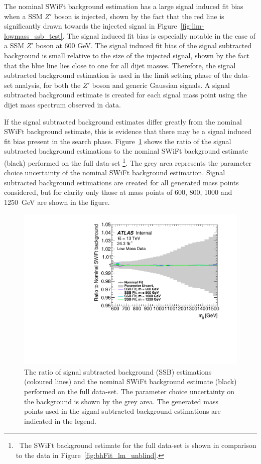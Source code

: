 The nominal SWiFt background estimation has a large signal induced fit bias when a SSM $Z'$ boson is injected,
shown by the fact that the red line is significantly drawn towards the injected signal in Figure~\ref{fig:lim-lowmass_ssb_test}.
The signal induced fit bias is especially notable in the case of a SSM $Z'$ boson at 600 GeV.
The signal induced fit bias of the signal subtracted background is small relative to the size of the injected signal,
shown by the fact that the blue line lies close to one for all dijet masses.
Therefore, the signal subtracted background estimation is used in the limit setting phase of the \lm{} data-set analysis,
for both the $Z'$ boson and generic Gaussian signals.
A signal subtracted background estimate is created for each signal mass point using the dijet mass spectrum observed in data.

If the signal subtracted background estimates differ greatly from the nominal SWiFt background estimate,
this is evidence that there may be a signal induced fit bias present in the search phase.
Figure~\ref{fig:lim-lowmass_ssb_data} shows the ratio of the 
signal subtracted background estimations to the nominal SWiFt background estimate (black) performed on the full \lm{} data-set
\footnote{\ The SWiFt background estimate for the full data-set is shown in comparison to the data in Figure~\ref{fig:bhFit_lm_unblind}.}.
The grey area represents the parameter choice uncertainty of the nominal SWiFt background estimation.
Signal subtracted background estimations are created for all generated mass points considered,
but for clarity only those at mass points of 600, 800, 1000 and 1250~GeV are shown in the figure.

\begin{figure}[!htb]
  \begin{center}
    \includegraphics[width=0.6\linewidth, angle=0]{figs/Dibjet/LowMass/lim-ssb_data.pdf}
  \end{center}
  \vspace{-1em}
  \caption[The ratio of signal subtracted background estimations
    and the SWiFt background estimate performed on the full \lm{} data-set.]
          {The ratio of signal subtracted background (SSB) estimations (coloured lines)
    and the nominal SWiFt background estimate (black) performed on the full \lm{} data-set.
    The parameter choice uncertainty on the background is shown by the grey area.
    The generated mass points used in the signal subtracted background estimations are indicated in the legend.}
  \label{fig:lim-lowmass_ssb_data}
\end{figure}

